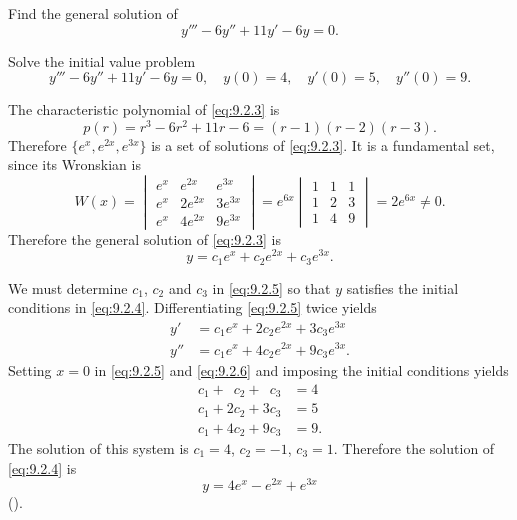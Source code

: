 \begin{example}\label{example:9.2.1}
\begin{alist}
\item %
Find the general solution of
\begin{equation} \label{eq:9.2.3}
y'''-6y''+11y'-6y=0.
\end{equation}
\item %
Solve the initial value problem
\begin{equation} \label{eq:9.2.4}
y'''-6y''+11y'-6y=0, \quad  y(0)=4,\quad y'(0)=5,\quad y''(0)=9.
\end{equation}
\end{alist}
\end{example}

\begin{alistSolution}
\item The characteristic polynomial of
\eqref{eq:9.2.3} is
\[
p(r)=r^3-6r^2+11r-6=(r-1)(r-2)(r-3).
\]
Therefore $\{e^x,e^{2x},e^{3x}\}$ is a set of solutions of
\eqref{eq:9.2.3}. It is a fundamental set, since its Wronskian is
\[
W(x)=\begin{vmatrix}
e^x&e^{2x}&e^{3x}\\
e^x&2e^{2x}&3e^{3x}\\
e^x&4e^{2x}&9e^{3x}
\end{vmatrix}=
e^{6x}\begin{vmatrix}1&1&1\\1&2&3\\1&4&9\end{vmatrix}=2e^{6x}\ne0.
\]
Therefore the general solution of \eqref{eq:9.2.3} is
\begin{equation} \label{eq:9.2.5}
y=c_1e^{x}+c_2e^{2x}+c_3e^{3x}.
\end{equation}

\item We must determine $c_1$, $c_2$ and $c_3$ in
\eqref{eq:9.2.5}
so that $y$ satisfies the initial conditions in \eqref{eq:9.2.4}.
Differentiating \eqref{eq:9.2.5} twice yields
\begin{equation} \label{eq:9.2.6}
\begin{aligned}
y'&=c_1e^{x}+2c_2e^{2x}+3c_3e^{3x}\\
y''&=c_1e^{x}+4c_2e^{2x}+9c_3e^{3x}.
\end{aligned}
\end{equation}
Setting $x=0$ in \eqref{eq:9.2.5} and \eqref{eq:9.2.6}  and imposing the
initial conditions yields
\begin{align*}
c_1+\phantom{2}c_2+\phantom{3}c_3&=4\\
c_1+2c_2+3c_3&=5\\
c_1+4c_2+9c_3&=9.
\end{align*}
The solution of this system is $c_1=4$, $c_2=-1$, $c_3=1$. Therefore the
solution of \eqref{eq:9.2.4} is
 \[
y=4e^x-e^{2x}+e^{3x}
\]
().
\end{alistSolution}

